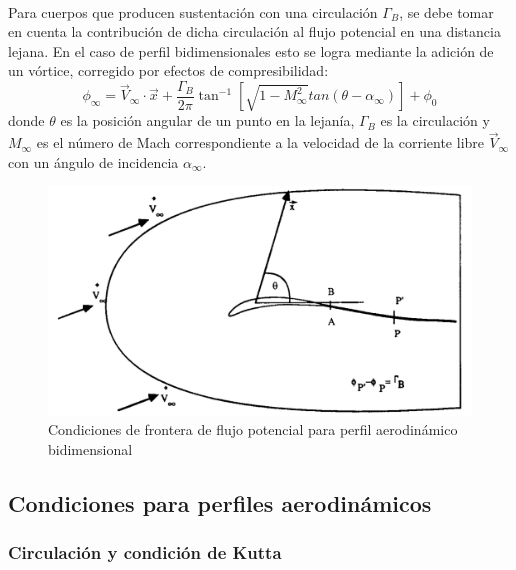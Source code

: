 \documentclass[letterpaper, openright, 12pt]{book}
\begin{document}
    \paragraph*{}
        Para cuerpos que producen sustentación con una circulación $\Gamma_{B}$,
        se debe tomar en cuenta la contribución de dicha circulación al flujo
        potencial en una distancia lejana. En el caso de perfil bidimensionales
        esto se logra mediante la adición de un vórtice, corregido por efectos
        de compresibilidad:
        \begin{equation}
            \phi_{\infty} = \vec{V}_{\infty} \cdot \vec{x}
                            + \frac{\Gamma_B}{2 \pi} \tan^{-1}
                                \left[ \sqrt{1-M_{\infty}^{2}}
                                tan(\theta - \alpha_{\infty}) \right] + \phi_{0}
        \end{equation}
        donde $\theta$ es la posición angular de un punto en la lejanía,
        $\Gamma_B$ es la circulación y $M_\infty$ es el número de Mach
        correspondiente a la velocidad de la corriente libre $\vec{V}_\infty$
        con un ángulo de incidencia $\alpha_{\infty}$.

        \begin{figure}[htbp!]
            \centering
            \includegraphics[keepaspectratio, width=115mm]{./Imagenes/circulacion_phi}
            \caption[Condiciones de frontera de flujo potencial]{Condiciones de
                frontera de flujo potencial para perfil aerodinámico
                bidimensional\cite{potential_flow}}
            \label{phi_circulacion_malla}
        \end{figure}

    \subsection{Condiciones para perfiles aerodinámicos}
    \subsubsection{Circulación y condición de Kutta}
\end{document}
